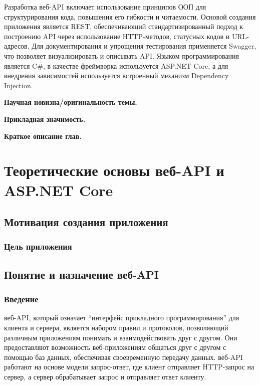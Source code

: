 \documentclass[a4paper,12pt]{report}
\begin{document}
Разработка веб-\acs{API} включает использование принципов \acs{ООП} для структурирования кода, повышения его гибкости и читаемости. 
Основой создания приложения является \ac{REST}, обеспечивающий стандартизированный подход к построению \acs{API} через использование 
\acs{HTTP}-методов, статусных кодов и \acs{URL}-адресов. Для документирования и упрощения тестирования применяется Swagger, что позволяет 
визуализировать и описывать \acs{API}. Языком программирования является C\#, в качестве фреймворка используется ASP.NET Core, а для 
внедрения зависимостей используется встроенный механизм Dependency Injection.

\textbf{Научная новизна/оригинальность темы.}

\textbf{Прикладная значимость.}

\textbf{Краткое описание глав.}


\chapter{Теоретические основы веб-\acs{API} и ASP.NET Core}\label{intro_chapter_title}

\section{Мотивация создания приложения}

\subsection{Цель приложения}

\subsection{}


\section{Понятие и назначение веб-\acs{API}}

\subsection{Введение}

веб-\acs{API}, который означает “интерфейс прикладного программирования” для клиента и сервера, 
является набором правил и протоколов, позволяющий различным приложениям понимать и взаимодействовать 
друг с другом. Они предоставляют возможность веб-приложениям общаться друг с другом с помощью баз данных, 
обеспечивая своевременную передачу данных. веб-\acs{API} работают на основе модели запрос-ответ, где клиент 
отправляет \acs{HTTP}-запрос  на сервер, а сервер обрабатывает запрос и отправляет ответ клиенту.
\end{document}
